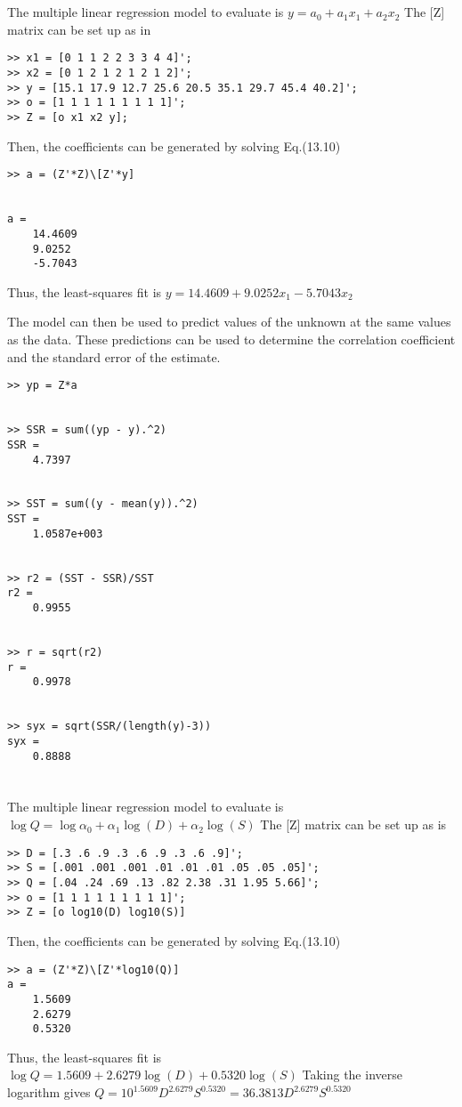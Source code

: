 \documentclass[../main.tex]{subfiles}
\begin{document}
\section{}
The multiple linear regression model to evaluate is 
	\bigbreak
$y=a_{0}+a_{1} x_{1}+a_{2} x_{2}$
	\bigbreak
The [Z] matrix can be set up as in 
	\bigbreak
\begin{lstlisting}[numbers=none]
>> x1 = [0 1 1 2 2 3 3 4 4]';
>> x2 = [0 1 2 1 2 1 2 1 2]';
>> y = [15.1 17.9 12.7 25.6 20.5 35.1 29.7 45.4 40.2]';
>> o = [1 1 1 1 1 1 1 1 1]';
>> Z = [o x1 x2 y];
\end{lstlisting}
	\bigbreak
Then, the coefficients can be generated by solving Eq.(13.10) 
	\bigbreak
\begin{lstlisting}[numbers=none]
>> a = (Z'*Z)\[Z'*y]


a =
	14.4609
	9.0252
	-5.7043
\end{lstlisting}
	\bigbreak
Thus, the least-squares fit is 
	\bigbreak
$y=14.4609+9.0252 x_{1}-5.7043 x_{2}$
	\bigbreak
\begin{blockquote}
The model can then be used to predict values of the unknown at the same values as the
data. These predictions can be used to determine the correlation coefficient and the standard
error of the estimate.
\end{blockquote}
	\bigbreak
\begin{lstlisting}[numbers=none]
>> yp = Z*a


>> SSR = sum((yp - y).^2)
SSR =
	4.7397


>> SST = sum((y - mean(y)).^2)
SST =
	1.0587e+003


>> r2 = (SST - SSR)/SST
r2 =
	0.9955


>> r = sqrt(r2)
r =
	0.9978


>> syx = sqrt(SSR/(length(y)-3))
syx =
	0.8888
\end{lstlisting}
	\bigbreak



\section{}
The multiple linear regression model to evaluate is
	\bigbreak
$\log Q=\log \alpha_{0}+\alpha_{1} \log (D)+\alpha_{2} \log (S)$
	\bigbreak
The [Z] matrix can be set up as is
	\bigbreak
\begin{lstlisting}[numbers=none]
>> D = [.3 .6 .9 .3 .6 .9 .3 .6 .9]';
>> S = [.001 .001 .001 .01 .01 .01 .05 .05 .05]';
>> Q = [.04 .24 .69 .13 .82 2.38 .31 1.95 5.66]';
>> o = [1 1 1 1 1 1 1 1 1]';
>> Z = [o log10(D) log10(S)] 
\end{lstlisting}
	\bigbreak
Then, the coefficients can be generated by solving Eq.(13.10)
\begin{lstlisting}[numbers=none]
>> a = (Z'*Z)\[Z'*log10(Q)]
a =
	1.5609
	2.6279
	0.5320 
\end{lstlisting}
	\bigbreak
Thus, the least-squares fit is
	\bigbreak
$\log Q=1.5609+2.6279 \log (D)+0.5320 \log (S)$
	\bigbreak
Taking the inverse logarithm gives
	\bigbreak
$Q=10^{1.5609} D^{2.6279} S^{0.5320}=36.3813 D^{2.6279} S^{0.5320}$
	\bigbreak
\end{document}
